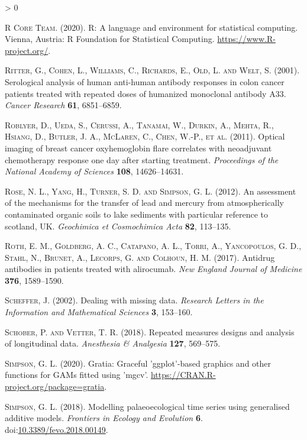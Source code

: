 \documentclass[
]{article}
\newlength{\cslhangindent}
\newenvironment{CSLReferences}[2] %
 {%
  \setlength{\parindent}{0pt}
  \ifodd #1 \everypar{\setlength{\hangindent}{\cslhangindent}}\ignorespaces\fi
  \ifnum #2 > 0
  \setlength{\parskip}{#2\baselineskip}
  \fi
 }%
 {}
\begin{document}
\begin{CSLReferences}{1}{0}
\leavevmode\hypertarget{ref-r}{}%
\textsc{R Core Team}. (2020). R: A language and environment for statistical computing. Vienna, Austria: R Foundation for Statistical Computing. \url{https://www.R-project.org/}.

\leavevmode\hypertarget{ref-ritter2001}{}%
\textsc{Ritter, G., Cohen, L., Williams, C., Richards, E., Old, L. and Welt, S.} (2001). {Serological analysis of human anti-human antibody responses in colon cancer patients treated with repeated doses of humanized monoclonal antibody A33}. \emph{{Cancer Research}} \textbf{{61}}, 6851--6859.

\leavevmode\hypertarget{ref-roblyer2011}{}%
\textsc{Roblyer, D., Ueda, S., Cerussi, A., Tanamai, W., Durkin, A., Mehta, R., Hsiang, D., Butler, J. A., McLaren, C., Chen, W.-P., et al.} (2011). Optical imaging of breast cancer oxyhemoglobin flare correlates with neoadjuvant chemotherapy response one day after starting treatment. \emph{Proceedings of the National Academy of Sciences} \textbf{108}, 14626--14631.

\leavevmode\hypertarget{ref-rose2012}{}%
\textsc{Rose, N. L., Yang, H., Turner, S. D. and Simpson, G. L.} (2012). An assessment of the mechanisms for the transfer of lead and mercury from atmospherically contaminated organic soils to lake sediments with particular reference to scotland, {UK}. \emph{Geochimica et Cosmochimica Acta} \textbf{82}, 113--135.

\leavevmode\hypertarget{ref-roth2017}{}%
\textsc{Roth, E. M., Goldberg, A. C., Catapano, A. L., Torri, A., Yancopoulos, G. D., Stahl, N., Brunet, A., Lecorps, G. and Colhoun, H. M.} (2017). Antidrug antibodies in patients treated with alirocumab. \emph{New England Journal of Medicine} \textbf{376}, 1589--1590.

\leavevmode\hypertarget{ref-scheffer2002}{}%
\textsc{Scheffer, J.} (2002). Dealing with missing data. \emph{Research Letters in the Information and Mathematical Sciences} \textbf{3}, 153--160.

\leavevmode\hypertarget{ref-schober2018}{}%
\textsc{Schober, P. and Vetter, T. R.} (2018). Repeated measures designs and analysis of longitudinal data. \emph{Anesthesia {\&} Analgesia} \textbf{127}, 569--575.

\leavevmode\hypertarget{ref-gratia}{}%
\textsc{Simpson, G. L.} (2020). Gratia: Graceful 'ggplot'-based graphics and other functions for GAMs fitted using 'mgcv'. \url{https://CRAN.R-project.org/package=gratia}.

\leavevmode\hypertarget{ref-simpson2018}{}%
\textsc{Simpson, G. L.} (2018). Modelling palaeoecological time series using generalised additive models. \emph{Frontiers in Ecology and Evolution} \textbf{6}. doi:\href{https://doi.org/10.3389/fevo.2018.00149}{10.3389/fevo.2018.00149}.


\end{CSLReferences}
\end{document}
